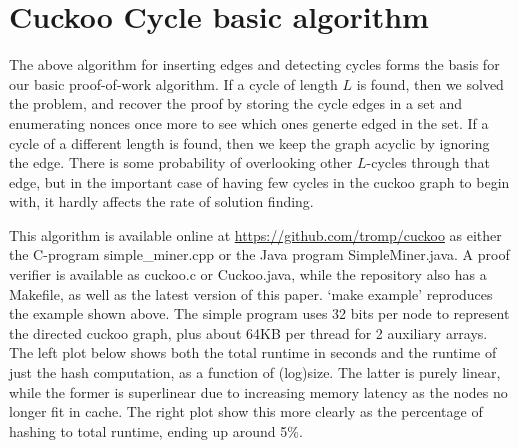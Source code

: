 \documentclass[11pt, oneside]{article}
\begin{document}
\section{Cuckoo Cycle basic algorithm}
The above algorithm for inserting edges and detecting cycles forms the basis
for our basic proof-of-work algorithm.
If a cycle of length $L$ is found, then we solved the problem, and recover the proof
by storing the cycle edges in a set and enumerating nonces once more to see which ones
generte edged in the set.
If a cycle of a different length is found, then we keep the graph acyclic by ignoring the edge.
There is some probability of overlooking other $L$-cycles
through that edge, but in the important case of having few cycles
in the cuckoo graph to begin with, it hardly affects the rate of solution finding.

This algorithm is available online at \url{https://github.com/tromp/cuckoo}
as either the C-program simple_miner.cpp or the Java program SimpleMiner.java.
A proof verifier is available as cuckoo.c or Cuckoo.java, while the repository
also has a Makefile, as well as the latest version of this paper.
`make example' reproduces the example shown above.
The simple program uses 32 bits per node to represent the directed cuckoo graph,
plus about 64KB per thread for 2 auxiliary arrays.
The left plot below shows both the total runtime in seconds and the runtime of just
the hash computation, as a function of (log)size. The latter is purely
linear, while the former is superlinear due to increasing memory latency
as the nodes no longer fit in cache. The right plot show this more clearly
as the percentage of hashing to total runtime, ending up around 5\%.
\end{document}
